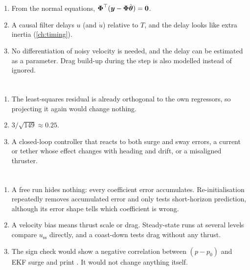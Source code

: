 \section*{}
\begin{enumerate}
  \item From the normal equations, $\boldsymbol{\Phi}^\top(\boldsymbol{y} - \boldsymbol{\Phi}\hat{\boldsymbol{\theta}}) = \boldsymbol{0}$.
  \item A causal filter delays $u$ (and $\dot u$) relative to $T$, and the delay looks like extra
        inertia (\cref{ch:timing}).
  \item No differentiation of noisy velocity is needed, and the delay can be estimated as a
        parameter. Drag build-up during the step is also modelled instead of ignored.
\end{enumerate}

\section*{}
\begin{enumerate}
  \item The least-squares residual is already orthogonal to the own regressors, so projecting it
        again would change nothing.
  \item $3/\sqrt{149} \approx 0.25$.
  \item A closed-loop controller that reacts to both surge and sway errors, a current or tether
        whose effect changes with heading and drift, or a misaligned thruster.
\end{enumerate}

\section*{}
\begin{enumerate}
  \item A free run hides nothing: every coefficient error accumulates. Re-initialisation
        repeatedly removes accumulated error and only tests short-horizon prediction, although
        its error shape tells which coefficient is wrong.
  \item A velocity bias means thrust scale or drag. Steady-state runs at several levels compare
        $u_\mathrm{ss}$ directly, and a coast-down tests drag without any thrust.
  \item The sign check would show a negative correlation between $(p - p_0)$ and EKF surge and
        print . It would not change anything itself.
\end{enumerate}

